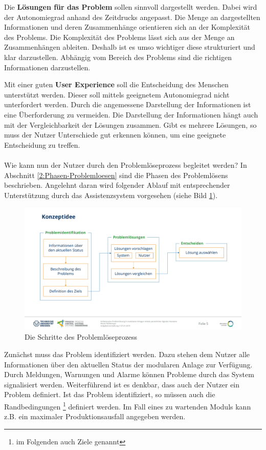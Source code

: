 Die \textbf{Lösungen für das Problem} sollen sinnvoll dargestellt werden. Dabei wird der Autonomiegrad anhand des Zeitdrucks angepasst. Die Menge an dargestellten Informationen und deren Zusammenhänge orientieren sich an der Komplexität des Problems. Die Komplexität des Problems lässt sich aus der Menge an Zusammenhängen ableiten. Deshalb ist es umso wichtiger diese strukturiert und klar darzustellen. Abhängig vom Bereich des Problems sind die richtigen Informationen darzustellen.

Mit einer guten \textbf{User Experience} soll die Entscheidung des Menschen unterstützt werden. Dieser soll mittels geeignetem Autonomiegrad nicht unterfordert werden. Durch die angemessene Darstellung der Informationen ist eine Überforderung zu vermeiden. Die Darstellung der Informationen hängt auch mit der Vergleichbarkeit der Lösungen zusammen. Gibt es mehrere Lösungen, so muss der Nutzer Unterschiede gut erkennen können, um eine geeignete Entscheidung zu treffen.
\\ \\
Wie kann nun der Nutzer durch den Problemlöseprozess begleitet werden? In Abschnitt \ref{2:Phasen-Problemloesen} sind die Phasen des Problemlösens beschrieben. Angelehnt daran wird folgender Ablauf mit entsprechender Unterstützung durch das Assistenzsystem vorgesehen (siehe Bild \ref{pic:Konzeptidee}).
\begin{figure}[htbp]
\centering
\includegraphics[scale=0.45]{DA_files/Bilder/Konzept/Konzeptidee.pdf}
\caption{Die Schritte des Problemlöseprozess}
\label{pic:Konzeptidee}
\end{figure}

Zunächst muss das Problem identifiziert werden. Dazu stehen dem Nutzer alle Informationen über den aktuellen Status der modularen Anlage zur Verfügung. Durch Meldungen, Warnungen und Alarme können Probleme durch das System signalisiert werden. Weiterführend ist es denkbar, dass auch der Nutzer ein Problem definiert. Ist das Problem identifiziert, so müssen auch die Randbedingungen \footnote{im Folgenden auch Ziele genannt}  definiert werden. Im Fall eines zu wartenden Moduls kann z.B. ein maximaler Produktionsausfall angegeben werden.

